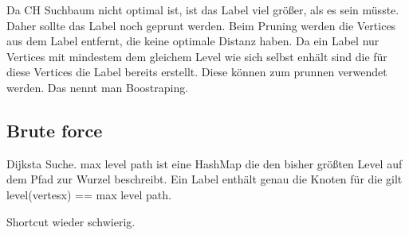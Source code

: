 Da CH Suchbaum nicht optimal ist, ist das Label viel größer, als es sein müsste. Daher sollte das Label noch geprunt werden.
Beim Pruning werden die Vertices aus dem Label entfernt, die keine optimale Distanz haben.
Da ein Label nur Vertices mit mindestem dem gleichem Level wie sich selbst enhält sind die für diese Vertices die Label bereits erstellt.
Diese können zum prunnen verwendet werden.
Das nennt man Boostraping.

\subsection{Brute force}
Dijksta Suche.
max level path ist eine HashMap die den bisher größten Level auf dem Pfad zur Wurzel beschreibt.
Ein Label enthält genau die Knoten für die gilt level(vertesx) == max level path.

Shortcut wieder schwierig.
